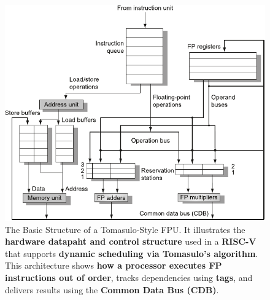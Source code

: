 \begin{figure}[!htp]
    \centering
    \includegraphics[width=\textwidth]{img/tomasulo-fpu.pdf}
    \caption{The Basic Structure of a Tomasulo-Style FPU.\cite{hennessy2017computer} It illustrates the \textbf{hardware datapaht and control structure} used in a \textbf{RISC-V } that supports \textbf{dynamic scheduling via Tomasulo's algorithm}. This architecture shows \textbf{how a processor executes FP instructions out of order}, tracks dependencies using \textbf{tags}, and delivers results using the \textbf{Common Data Bus (CDB)}.}
\end{figure}


